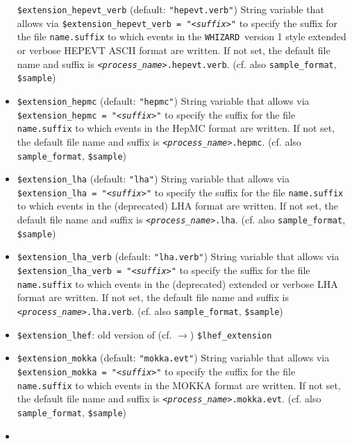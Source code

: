 \documentclass[12pt]{book}
\newcommand{\ttt}[1]{\texttt{#1}}
\newcommand{\whizard}{\texttt{WHIZARD}}
\begin{document}
\begin{itemize}
\ttt{\$extension\_hepevt\_verb} \qquad (default: \ttt{"hepevt.verb"}) \newline
String variable that allows via \ttt{\$extension\_hepevt\_verb = "{\em <suffix>}"} to
specify the suffix for the file \ttt{name.suffix} to which events in
the \whizard\ version 1 style extended or verbose HEPEVT ASCII format
are written. If not set, the default file name and suffix is
\ttt{{\em <process\_name>}.hepevt.verb}. (cf. also \ttt{sample\_format},
\ttt{\$sample})   
\item
\ttt{\$extension\_hepmc} \qquad (default: \ttt{"hepmc"}) \newline
String variable that allows via \ttt{\$extension\_hepmc = "{\em <suffix>}"} to 
specify the suffix for the file \ttt{name.suffix} to which events in
the HepMC format are written. If not set, the default file name and suffix is
\ttt{{\em <process\_name>}.hepmc}. (cf. also \ttt{sample\_format},
\ttt{\$sample})  
\item
\ttt{\$extension\_lha} \qquad (default: \ttt{"lha"}) \newline
String variable that allows via \ttt{\$extension\_lha = "{\em <suffix>}"} to 
specify the suffix for the file \ttt{name.suffix} to which events in
the (deprecated) LHA format are written. If not set, the default file
name and suffix is \ttt{{\em <process\_name>}.lha}. (cf. also \ttt{sample\_format},
\ttt{\$sample})  
\item
\ttt{\$extension\_lha\_verb} \qquad (default: \ttt{"lha.verb"}) \newline
String variable that allows via \ttt{\$extension\_lha\_verb = "{\em <suffix>}"} to
specify the suffix for the file \ttt{name.suffix} to which events in
the (deprecated) extended or verbose LHA format are written. If not
set, the default file name and suffix is
\ttt{{\em <process\_name>}.lha.verb}. (cf. also \ttt{sample\_format},
\ttt{\$sample})  
\item
\ttt{\$extension\_lhef}: old version of (cf. $\to$)
\ttt{\$lhef\_extension}
\item
\ttt{\$extension\_mokka} \qquad (default: \ttt{"mokka.evt"}) \newline
String variable that allows via \ttt{\$extension\_mokka = "{\em <suffix>}"} to 
specify the suffix for the file \ttt{name.suffix} to which events in
the MOKKA format are written. If not set, the default file
name and suffix is \ttt{{\em <process\_name>}.mokka.evt}. (cf. also \ttt{sample\_format},
\ttt{\$sample})  
\item

\end{itemize}
\end{document}
